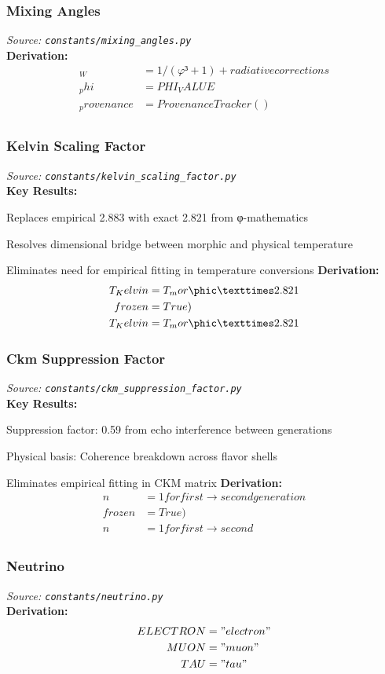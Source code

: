 \subsubsection{Mixing Angles}
\textit{Source: \texttt{constants/mixing_angles.py}}\\

\textbf{Derivation:}
\begin{align}
_W &= 1/(φ³+1) + radiative corrections \\
_phi &= PHI_VALUE \\
_provenance &= ProvenanceTracker() \\
\end{align}

\subsubsection{Kelvin Scaling Factor}
\textit{Source: \texttt{constants/kelvin_scaling_factor.py}}\\

\textbf{Key Results:}
\item Replaces empirical 2.883 with exact 2.821 from φ-mathematics
\item Resolves dimensional bridge between morphic and physical temperature
\item Eliminates need for empirical fitting in temperature conversions
\textbf{Derivation:}
\begin{align}
T_Kelvin &= T_mor\phic × 2.821 \\
frozen &= True) \\
T_Kelvin &= T_mor\phic × 2.821 \\
\end{align}

\subsubsection{Ckm Suppression Factor}
\textit{Source: \texttt{constants/ckm_suppression_factor.py}}\\

\textbf{Key Results:}
\item Suppression factor: 0.59 from echo interference between generations
\item Physical basis: Coherence breakdown across flavor shells
\item Eliminates empirical fitting in CKM matrix
\textbf{Derivation:}
\begin{align}
n &= 1 for first → second generation \\
frozen &= True) \\
n &= 1 for first → second \\
\end{align}

\subsubsection{Neutrino}
\textit{Source: \texttt{constants/neutrino.py}}\\

\textbf{Derivation:}
\begin{align}
ELECTRON &= "electron" \\
MUON &= "muon" \\
TAU &= "tau" \\
\end{align}
